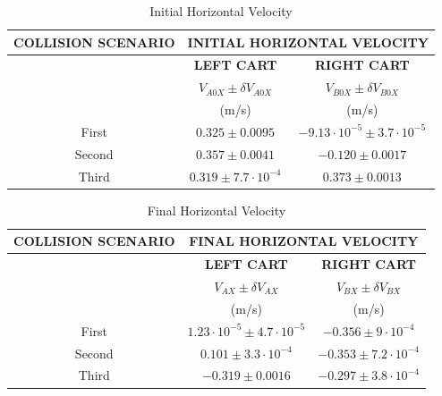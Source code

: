 \documentclass{article}
\begin{document}
\begin{table}[H]
\centering
\begin{tabular}{|c|c|c|}
\hline
\textbf{COLLISION SCENARIO} & \multicolumn{2}{c|}{\textbf{INITIAL HORIZONTAL VELOCITY}} \\ 
\hline
 & \textbf{LEFT CART} & \textbf{RIGHT CART} \\
 & $V_{A0X} \pm \delta V_{A0X}$ & $V_{B0X} \pm \delta V_{B0X}$ \\
 & (m/s) & (m/s) \\
\hline
First & $0.325 \pm 0.0095$ & $-9.13 \cdot 10^{-5} \pm 3.7 \cdot 10^{-5}$ \\
\hline
Second & $0.357 \pm 0.0041$ & $-0.120 \pm 0.0017$ \\
\hline
Third & $0.319 \pm 7.7 \cdot 10^{-4}$ & $0.373 \pm 0.0013$ \\
\hline
\end{tabular}
\caption{Initial Horizontal Velocity}
\label{tab:initial_velocity}
\end{table}


\begin{table}[H]
\centering
\begin{tabular}{|c|c|c|}
\hline
\textbf{COLLISION SCENARIO} & \multicolumn{2}{c|}{\textbf{FINAL HORIZONTAL VELOCITY}} \\ 
\hline
 & \textbf{LEFT CART} & \textbf{RIGHT CART} \\
 & $V_{AX} \pm \delta V_{AX}$ & $V_{BX} \pm \delta V_{BX}$ \\
 & (m/s) & (m/s) \\
\hline
First & $1.23 \cdot 10^{-5} \pm 4.7 \cdot 10^{-5}$ & $-0.356 \pm 9 \cdot 10^{-4}$ \\
\hline
Second & $0.101 \pm 3.3 \cdot 10^{-4}$ & $-0.353 \pm 7.2 \cdot 10^{-4}$ \\
\hline
Third & $-0.319 \pm 0.0016$ & $-0.297 \pm 3.8 \cdot 10^{-4}$ \\
\hline
\end{tabular}
\caption{Final Horizontal Velocity}
\label{tab:final_velocity}
\end{table}
\end{document}
